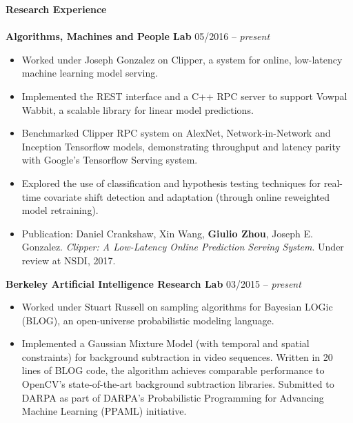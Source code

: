 \documentclass{article}
\begin{document}
\noindent
\textbf{{\Large Research Experience}}\\[-2mm]
\HRule\\
\noindent
\textbf{Algorithms, Machines and People Lab}
\hfill 05/2016 -- \textit{present}
\begin{itemize}
\vspace{-2.5mm}
\item Worked under Joseph Gonzalez on Clipper, a system for online, low-latency machine learning model serving.
\vspace{-2.5mm}
\item Implemented the REST interface and a C++ RPC server to support Vowpal Wabbit, a scalable library for linear model predictions.
\vspace{-2.5mm}
\item Benchmarked Clipper RPC system on AlexNet, Network-in-Network and Inception Tensorflow models, demonstrating throughput and latency parity with Google's Tensorflow Serving system.
\vspace{-2.5mm}
\item Explored the use of classification and hypothesis testing techniques for real-time covariate shift detection and adaptation (through online reweighted model retraining).
\vspace{-2.5mm}
\item Publication: Daniel Crankshaw, Xin Wang, \textbf{Giulio Zhou}, Joseph E. Gonzalez. \textit{Clipper: A Low-Latency Online Prediction Serving System}. Under review at NSDI, 2017. 
\end{itemize}
\vspace{-2mm}

\noindent
\textbf{Berkeley Artificial Intelligence Research Lab}
\hfill 03/2015 -- \textit{present}
\begin{itemize}
\vspace{-2.5mm}
\item Worked under Stuart Russell on sampling algorithms for Bayesian LOGic (BLOG), an open-universe probabilistic modeling language.
\vspace{-2.5mm}
\item Implemented a Gaussian Mixture Model (with temporal and spatial constraints) for background subtraction in video sequences. Written in 20 lines of BLOG code, the algorithm achieves comparable performance to OpenCV's state-of-the-art background subtraction libraries. Submitted to DARPA as part of DARPA's Probabilistic Programming for Advancing Machine Learning (PPAML) initiative.
\end{itemize}
\vspace{-2mm}
\end{document}

